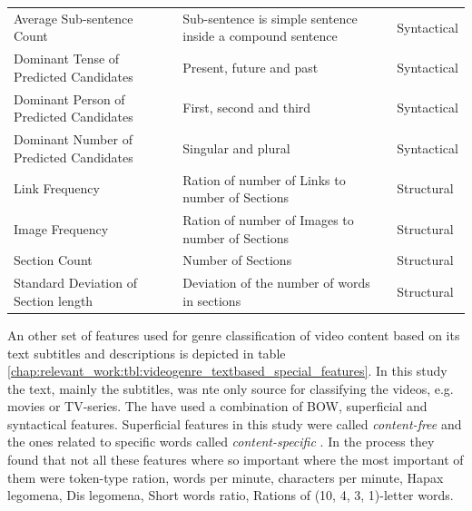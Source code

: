 \begin{table}[t]
\begin{tabular}{p{4cm}p{7cm}p{3cm}}
        Average Sub-sentence Count & Sub-sentence is simple sentence inside a compound sentence & Syntactical \\
        Dominant Tense of  Predicted Candidates & Present, future and past & Syntactical \\
        Dominant Person of  Predicted Candidates & First, second and third & Syntactical \\
        Dominant Number of  Predicted Candidates & Singular and plural & Syntactical \\
		Link Frequency & Ration of number of Links to number of Sections  & Structural \\
        Image Frequency & Ration of number of Images to number of Sections  & Structural \\
        Section Count & Number of Sections & Structural \\
        Standard Deviation of Section length & Deviation of the number of words in sections & Structural \\
		\hline
	\end{tabular}
\end{table}


An other set of features used for genre classification of video content based on its text subtitles and descriptions is depicted in table \ref{chap:relevant_work:tbl:videogenre_textbased_special_features}. In this study the text, mainly the subtitles, was nte only source for classifying the videos, e.g. movies or TV-series. The have used a combination of BOW, superficial and syntactical features. Superficial features in this study were called \textit{content-free} and the ones related to specific words called \textit{content-specific} \parencite{lee2017text}. In the process they found that not all these features where so important where the most important of them were token-type ration, words per minute, characters per minute, Hapax legomena, Dis legomena, Short words ratio, Rations of  (10, 4, 3, 1)-letter words. 

